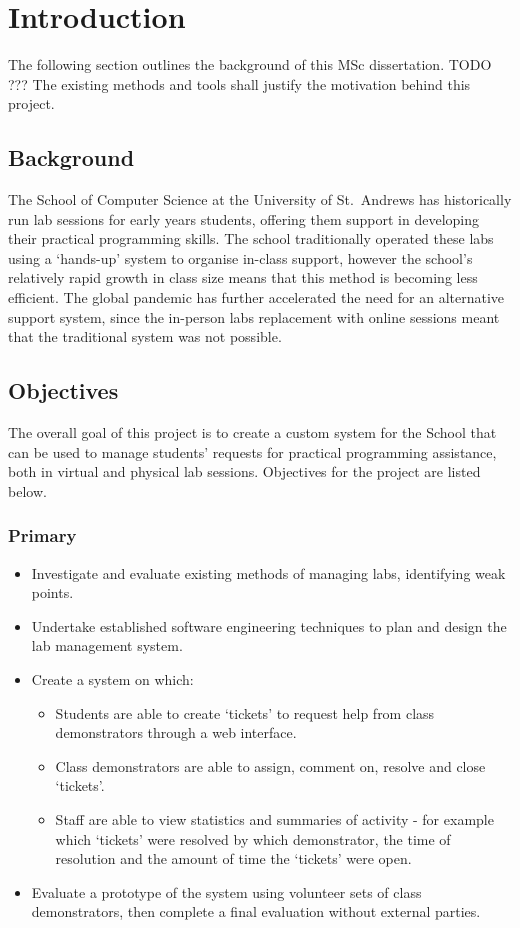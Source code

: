 \chapter{Introduction}
The following section outlines the background of this MSc dissertation. TODO ??? The existing methods and tools shall justify the motivation behind this project. 

\section{Background}

The School of Computer Science at the University of St.\ Andrews has historically run lab sessions for early years students, offering them support in developing their practical programming skills. The school traditionally operated these labs using a ‘hands-up’ system to organise in-class support, however the school's relatively rapid growth in class size means that this method is becoming less efficient. The global pandemic has further accelerated the need for an alternative support system, since the in-person labs replacement with online sessions meant that the traditional system was not possible. 


\section{Objectives}

The overall goal of this project is to create a custom system for the School that can be used to manage students' requests for practical programming assistance, both in virtual and physical lab sessions. Objectives for the project are listed below.

\subsection{Primary}
\begin{itemize}
    \item Investigate and evaluate existing methods of managing labs, identifying weak points.
    \item Undertake established software engineering techniques to plan and design the lab management system.
    \item Create a system on which:
    \begin{itemize}
        \item Students are able to create `tickets' to request help from class demonstrators through a web interface.
        \item Class demonstrators are able to assign, comment on, resolve and close `tickets'.
        \item Staff are able to view statistics and summaries of activity - for example which `tickets' were resolved by which demonstrator, the time of resolution and the amount of time the `tickets' were open.
    \end{itemize}
    \item Evaluate a prototype of the system using volunteer sets of class demonstrators, then complete a final evaluation without external parties. 
    
\end{itemize}


